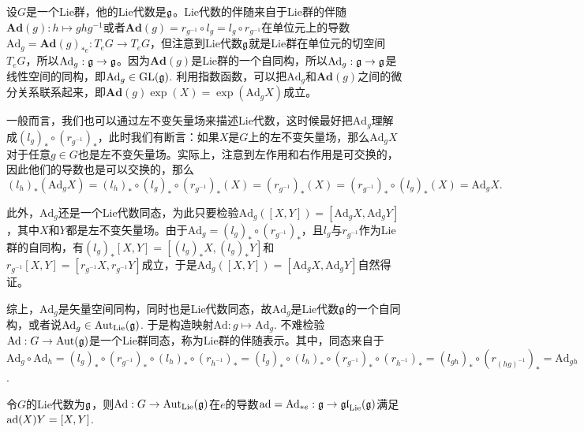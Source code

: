 \para 设$G$是一个Lie群，他的Lie代数是${\mathfrak{g}}$。Lie代数的伴随来自于Lie群的伴随$\mathbf{Ad}(g):h\mapsto ghg^{-1}$或者$\mathbf{Ad}(g)=r_{g^{-1}}\circ l_g=l_g\circ r_{g^{-1}}$在单位元上的导数$\mathrm{Ad}_g=\mathbf{Ad}(g)_{*e}:T_eG\to T_eG$，但注意到Lie代数${\mathfrak{g}}$就是Lie群在单位元的切空间$T_eG$，所以$\mathrm{Ad}_g:{\mathfrak{g}}\to {\mathfrak{g}}$。因为$\mathbf{Ad}(g)$是Lie群的一个自同构，所以$\mathrm{Ad}_g:{\mathfrak{g}}\to{\mathfrak{g}}$是线性空间的同构，即$\mathrm{Ad}_g\in \mathrm{GL}({\mathfrak{g}})$. 利用指数函数，可以把$\mathrm{Ad}_g$和$\mathbf{Ad}(g)$之间的微分关系联系起来，即$\mathbf{Ad}(g)\exp(X)=\exp(\mathrm{Ad}_gX)$成立。

\para 一般而言，我们也可以通过左不变矢量场来描述Lie代数，这时候最好把$\mathrm{Ad}_g$理解成$(l_g)_*\circ (r_{g^{-1}})_*$，此时我们有断言：如果$X$是$G$上的左不变矢量场，那么$\mathrm{Ad}_gX$对于任意$g\in G$也是左不变矢量场。实际上，注意到左作用和右作用是可交换的，因此他们的导数也是可以交换的，那么
\[
	(l_h)_*(\mathrm{Ad}_gX)=(l_h)_*\circ (l_g)_*\circ (r_{g^{-1}})_*(X)=(r_{g^{-1}})_*(X)=(r_{g^{-1}})_*\circ (l_g)_*(X)=\mathrm{Ad}_gX.
\]

此外，$\mathrm{Ad}_g$还是一个Lie代数同态，为此只要检验$\mathrm{Ad}_g([X,Y])=[\mathrm{Ad}_gX,\mathrm{Ad}_gY]$，其中$X$和$Y$都是左不变矢量场。由于$\mathrm{Ad}_g=(l_g)_*\circ (r_{g^{-1}})_*$，且$l_g$与$r_{g^{-1}}$作为Lie群的自同构，有$(l_g)_*[X,Y]=[(l_g)_*X,(l_g)_*Y]$和$r_{g^{-1}}[X,Y]=[r_{g^{-1}}X,r_{g^{-1}}Y]$成立，于是$\mathrm{Ad}_g([X,Y])=[\mathrm{Ad}_gX,\mathrm{Ad}_gY]$自然得证。

综上，$\mathrm{Ad}_g$是矢量空间同构，同时也是Lie代数同态，故$\mathrm{Ad}_g$是Lie代数${\mathfrak{g}}$的一个自同构，或者说$\mathrm{Ad}_g\in \mathrm{Aut}_{\mathrm{Lie}}({\mathfrak{g}})$. 于是构造映射$\mathrm{Ad}:g\mapsto \mathrm{Ad}_g$. 不难检验$\mathrm{Ad}:G\to \mathrm{Aut}({\mathfrak{g}})$是一个Lie群同态，称为Lie群的伴随表示。其中，同态来自于$\mathrm{Ad}_g\circ \mathrm{Ad}_h=(l_g)_*\circ (r_{g^{-1}})_*\circ (l_h)_*\circ (r_{h^{-1}})_*=(l_g)_*\circ (l_h)_*\circ (r_{g^{-1}})_*\circ (r_{h^{-1}})_*=(l_{gh})_*\circ (r_{(hg)^{-1}})_*=\mathrm{Ad}_{gh}$.


\pro 令$G$的Lie代数为${\mathfrak{g}}$，则$\mathrm{Ad}:G\to \mathrm{Aut}_{\mathrm{Lie}}({\mathfrak{g}})$在$e$的导数$\operatorname{ad}=\mathrm{Ad}_{*e}:{\mathfrak{g}}\to \mathfrak{gl}_{\mathrm{Lie}}({\mathfrak{g}})$满足$\operatorname{ad}(X)Y=[X,Y]$.

